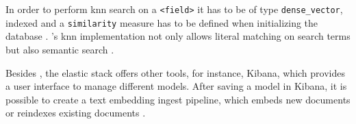 In order to perform \ac{knn} search on a \texttt{<field>} it has to be of type \texttt{dense\_vector}, indexed and a \texttt{similarity} measure has to be defined when initializing the database \cite{Elasticsearch-knn}.
\databaseName{}'s \ac{knn} implementation not only allows literal matching on search terms but also semantic search \cite{Elasticsearch-knn}.

Besides \databaseName{}, the elastic stack offers other tools, for instance, Kibana, which provides a user interface to manage different models.
After saving a model in Kibana, it is possible to create a text embedding ingest pipeline, which embeds new documents or reindexes existing documents \cite{Elasticsearch-knn-embedding}.
